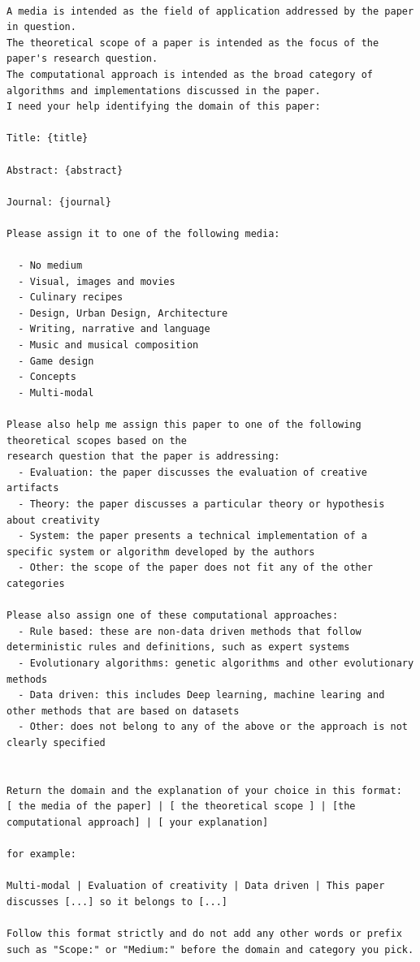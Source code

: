 \begin{lstlisting}

A media is intended as the field of application addressed by the paper in question.
The theoretical scope of a paper is intended as the focus of the paper's research question.
The computational approach is intended as the broad category of algorithms and implementations discussed in the paper.
I need your help identifying the domain of this paper:

Title: {title}

Abstract: {abstract}

Journal: {journal}

Please assign it to one of the following media:

  - No medium
  - Visual, images and movies
  - Culinary recipes
  - Design, Urban Design, Architecture
  - Writing, narrative and language
  - Music and musical composition
  - Game design
  - Concepts
  - Multi-modal

Please also help me assign this paper to one of the following theoretical scopes based on the
research question that the paper is addressing:
  - Evaluation: the paper discusses the evaluation of creative artifacts
  - Theory: the paper discusses a particular theory or hypothesis about creativity
  - System: the paper presents a technical implementation of a specific system or algorithm developed by the authors
  - Other: the scope of the paper does not fit any of the other categories

Please also assign one of these computational approaches:
  - Rule based: these are non-data driven methods that follow deterministic rules and definitions, such as expert systems
  - Evolutionary algorithms: genetic algorithms and other evolutionary methods
  - Data driven: this includes Deep learning, machine learing and other methods that are based on datasets
  - Other: does not belong to any of the above or the approach is not clearly specified


Return the domain and the explanation of your choice in this format:
[ the media of the paper] | [ the theoretical scope ] | [the computational approach] | [ your explanation]

for example:

Multi-modal | Evaluation of creativity | Data driven | This paper discusses [...] so it belongs to [...]

Follow this format strictly and do not add any other words or prefix such as "Scope:" or "Medium:" before the domain and category you pick.

\end{lstlisting}


